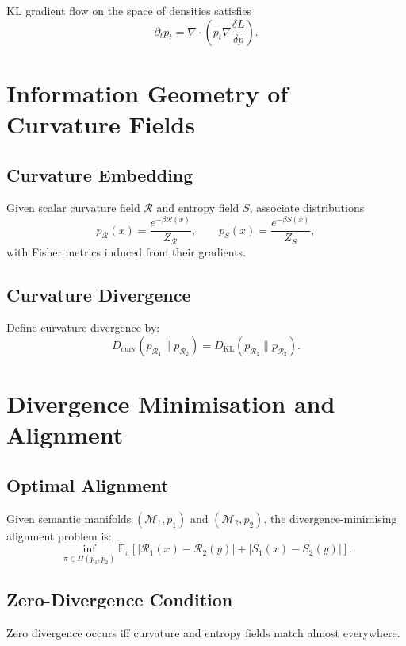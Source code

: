 KL gradient flow on the space of densities satisfies
\[
\partial_t p_t
  = \nabla \cdot \!\left( p_t \nabla \frac{\delta L}{\delta p} \right).
\]

\section{Information Geometry of Curvature Fields}

\subsection{Curvature Embedding}

Given scalar curvature field $\mathcal{R}$ and entropy field $S$,
associate distributions
\[
p_{\mathcal{R}}(x) = \frac{e^{-\beta \mathcal{R}(x)}}{Z_{\mathcal{R}}},
\qquad
p_{S}(x) = \frac{e^{-\beta S(x)}}{Z_{S}},
\]
with Fisher metrics induced from their gradients.

\subsection{Curvature Divergence}

Define curvature divergence by:
\[
D_{\mathrm{curv}}(p_{\mathcal{R}_1}\|p_{\mathcal{R}_2})
  = D_{\mathrm{KL}}(p_{\mathcal{R}_1}\|p_{\mathcal{R}_2}).
\]

\section{Divergence Minimisation and Alignment}

\subsection{Optimal Alignment}

Given semantic manifolds $(\mathcal{M}_1,p_1)$ and $(\mathcal{M}_2,p_2)$, the divergence-minimising alignment problem is:
\[
\inf_{\pi\in\Pi(p_1,p_2)}
  \mathbb{E}_{\pi}\!\left[
      |\mathcal{R}_1(x)-\mathcal{R}_2(y)|
      +
      |S_1(x)-S_2(y)|
    \right].
\]

\subsection{Zero-Divergence Condition}

Zero divergence occurs iff curvature and entropy fields match almost everywhere.


